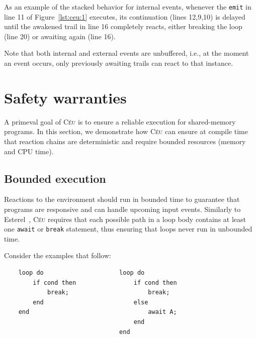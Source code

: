 \documentclass[preprint]{sigplanconf}
\newcommand{\CEU}{\textsc{C\'{e}u}\xspace}
\newcommand{\code}[1] {{\small{\texttt{#1}}}}
\newcommand{\1}{\;}
\newcommand{\2}{\;\;}
\newcommand{\3}{\;\;\;}
\newcommand{\5}{\;\;\;\;\;}
\begin{document}
As an example of the stacked behavior for internal events, whenever the 
\code{emit} in line 11 of Figure~\ref{lst:ceu:1} executes, its continuation 
(lines 12,9,10) is delayed until the awakened trail in line 16 completely 
reacts, either breaking the loop (line 20) or awaiting again (line 16).

Note that both internal and external events are unbuffered, i.e., at the moment 
an event occurs, only previously awaiting trails can react to that instance.





\section{Safety warranties}
\label{sec.safety}

A primeval goal of \CEU is to ensure a reliable execution for shared-memory 
programs.
In this section, we demonstrate how \CEU can ensure at compile time
that reaction chains are deterministic and require bounded resources (memory 
and CPU time).

\subsection{Bounded execution}
\label{sec.safety.bounded}

Reactions to the environment should run in bounded time to guarantee that 
programs are responsive and can handle upcoming input events.
Similarly to Esterel~\cite{esterel.ieee91}, \CEU requires that each possible 
path in a loop body contains at least one \code{await} or \code{break} 
statement, thus ensuring that loops never run in unbounded time.

Consider the examples that follow:

{\small
\begin{verbatim}
    loop do                     loop do
        if cond then                if cond then
            break;                      break;
        end                         else
    end                                 await A;
                                    end
                                end
\end{verbatim}
}
\end{document}
